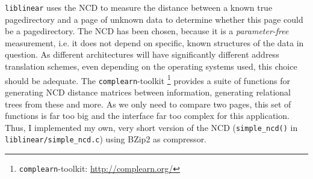 \texttt{liblinear} uses the NCD to measure the distance between a known true
pagedirectory and a page of unknown data to determine whether this page could be
a pagedirectory. The NCD has been chosen, because it is a \emph{parameter-free}
measurement, i.e. it does not depend on specific, known structures of the data
in question. As different architectures will have significantly different
address translation schemes, even depending on the operating systems used, this
choice should be adequate. The \texttt{complearn}-toolkit
\footnote{\texttt{complearn}-toolkit:
\href{http://complearn.org/}{http://complearn.org/}} provides a suite of
functions for generating NCD distance matrices between information, generating
relational trees from these and more.  As we only need to compare two pages,
this set of functions is far too big and the interface far too complex for this
application.  Thus, I implemented my own, very short version of the NCD
(\texttt{simple\_ncd()} in \texttt{liblinear/simple\_ncd.c}) using BZip2 as
compressor.

